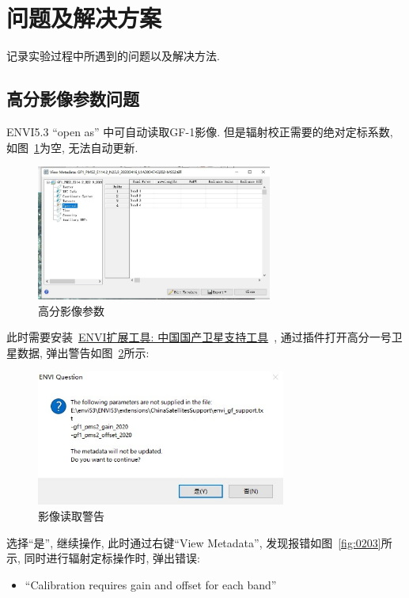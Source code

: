 \section{问题及解决方案}
记录实验过程中所遇到的问题以及解决方法.

\subsection{高分影像参数问题}
ENVI5.3 ``open as'' 中可自动读取GF-1影像. 但是辐射校正需要的绝对定标系数, 如图~\ref{fig:0201}为空, 无法自动更新. 

\begin{figure}[htbp]
    \centering
    \includegraphics[height=12em]{pic/q1_05.jpg}
    \caption{高分影像参数}
    \label{fig:0201}
\end{figure}

此时需要安装~\href{http://blog.sina.com.cn/s/blog_764b1e9d0102xjbj.html#cmt_5AD807AE-3B2A6BFD-6A4E9A6B-91B-8EF}{ENVI扩展工具: 中国国产卫星支持工具}~, 通过插件打开高分一号卫星数据, 弹出警告如图~\ref{fig:0202}所示:

\begin{figure}[htbp]
    \centering
    \includegraphics[height=12em]{pic/q1_01.jpg}
    \caption{影像读取警告}
    \label{fig:0202}
\end{figure}

选择``是'', 继续操作, 此时通过右键``View Metadata'', 发现报错如图~\ref{fig:0203}所示, 同时进行辐射定标操作时, 弹出错误:
\begin{itemize}
    \item ``Calibration requires gain and offset for each band''
\end{itemize}

